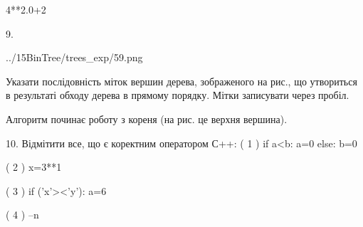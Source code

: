 \documentclass[11pt]{article}
\begin{document}
4**2.0+2
\vspace{5mm}

9. 

\begin{center}
	{../15BinTree/trees_exp/59.png}
\end{center}
Указати послідовність міток вершин дерева, зображеного на рис., що утвориться в результаті обходу дерева в прямому порядку. Мітки записувати через пробіл.\par Алгоритм починає роботу з кореня (на рис. це верхня вершина).
\vspace{5mm}

10. %
Відмітити все, що є коректним оператором С++:
( 1 ) if a<b: a=0 else: b=0

( 2 ) x=3**1

( 3 ) if ('x'><'y'): a=6

( 4 ) --n
\vspace{5mm}

\newpage
\end{document}
